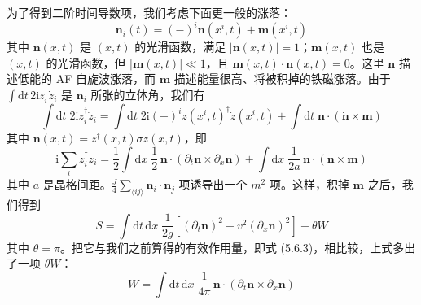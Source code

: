 为了得到二阶时间导数项，我们考虑下面更一般的涨落：
\begin{equation*}
\pmb{n}_{i}(t)=(-)^{i}\pmb{n}(x^{i},t)+\pmb{m}(x^{i},t) \tag{5.6.11}
\end{equation*}
其中 $\pmb{n}(x,t)$ 是 $(x,t)$ 的光滑函数，满足 $|\pmb{n}(x,t)|=1$；$\pmb{m}(x,t)$ 也是 $(x,t)$ 的光滑函数，但 $|\pmb{m}(x,t)|\ll 1$，且 $\pmb{m}(x,t)\cdot\pmb{n}(x,t)=0$。这里 $\pmb{n}$ 描述低能的 AF 自旋波涨落，而 $\pmb{m}$ 描述能量很高、将被积掉的铁磁涨落。由于 $\int \mathrm{d}t\,2\mathrm{i}z^{\dagger}_{i}\dot{z}_{i}$ 是 $\pmb{n}_{i}$ 所张的立体角，我们有
\begin{equation*}
\int \mathrm{d}t\;2\mathrm{i}z^{\dagger}_{i}\dot{z}_{i}=\int \mathrm{d}t\;2\mathrm{i}(-)^{i}z(x^{i},t)^{\dagger}\dot{z}(x^{i},t)+\int \mathrm{d}t\;\pmb{n}\cdot(\dot{\pmb{n}}\times\pmb{m})
\end{equation*}
其中 $\pmb{n}(x,t)=z^{\dagger}(x,t)\sigma z(x,t)$，即
\begin{equation*}
\mathrm{i}\sum_{i}z^{\dagger}_{i}\dot{z}_{i}=\frac{1}{2}\int \mathrm{d}x\;\frac{1}{2}\,\pmb{n}\cdot(\partial_{t}\pmb{n}\times\partial_{x}\pmb{n})+\int \mathrm{d}x\;\frac{1}{2a}\,\pmb{n}\cdot(\dot{\pmb{n}}\times\pmb{m})
\end{equation*}
其中 $a$ 是晶格间距。$\frac{J}{4}\sum_{\langle ij\rangle}\pmb{n}_{i}\cdot\pmb{n}_{j}$ 项诱导出一个 $m^{2}$ 项。这样，积掉 $\pmb{m}$ 之后，我们得到
\begin{equation*}
S=\int \mathrm{d}t\,\mathrm{d}x\;\frac{1}{2g}\left[(\partial_{t}\pmb{n})^{2}-v^{2}(\partial_{x}\pmb{n})^{2}\right]+\theta W \tag{5.6.12}
\end{equation*}
其中 $\theta=\pi$。把它与我们之前算得的有效作用量，即式 (5.6.3)，相比较，上式多出了一项 $\theta W$：
\begin{equation*}
W=\int \mathrm{d}t\,\mathrm{d}x\;\frac{1}{4\pi}\,\pmb{n}\cdot(\partial_{t}\pmb{n}\times\partial_{x}\pmb{n}) \tag{5.6.13}
\end{equation*}
